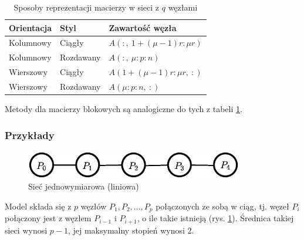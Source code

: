 \begin{table}[H]\label{tab:network_datatype}
\centering
\caption{Sposoby reprezentacji macierzy w sieci z \(q\) węzłami}
\begin{tabular}{ l | l | l }
  Orientacja & Styl & Zawartość węzła \\
  \hline
  Kolumnowy & Ciągły & \(A(\colon,\: 1+(\mu-1)r\colon \mu r)\) \\
  Kolumnowy & Rozdawany & \(A(\colon,\: \mu\colon p\colon n)\) \\
  Wierszowy & Ciągły & \(A(1+(\mu -1) r\colon\mu r,\: \colon)\) \\
  Wierszowy & Rozdawany & \(A(\mu \colon p\colon n,\: \colon)\) \\
 \end{tabular} 
 \end{table}

Metody dla macierzy blokowych są analogiczne do tych z tabeli \ref{tab:network_datatype}.





\subsubsection{Przykłady}

\begin{przyklad}
\begin{figure}[h]
\centering
\includegraphics[width=9.5cm]{images/mesh1d}
\caption{Sieć jednowymiarowa (liniowa)}
\label{fig:model_mesh1d}
\end{figure}
Model składa się z \(p\) węzłów \(P_1, P_2, \dots, P_p\) połączonych ze sobą w ciąg, tj. węzeł \(P_i\) połączony jest z węzłem \(P_{i-1}\) i \(P_{i+1}\), o ile takie istnieją (rys. \ref{fig:model_mesh1d}). Średnica takiej sieci wynosi \(p-1\), jej maksymalny stopień wynosi \(2\).\\
\end{przyklad}

